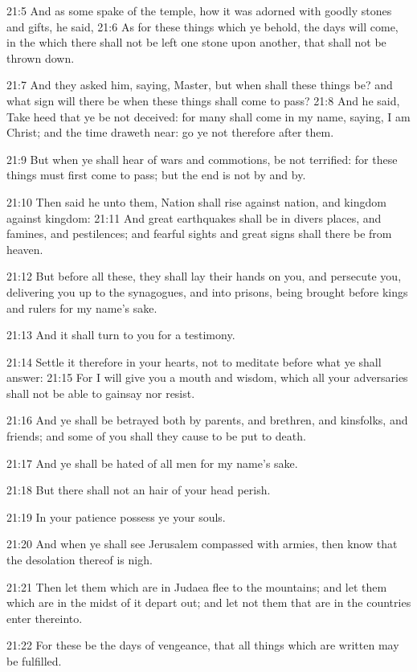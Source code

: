 21:5 And as some spake of the temple, how it was adorned with goodly stones and gifts, he said, 21:6 As for these things which ye behold, the days will come, in the which there shall not be left one stone upon another, that shall not be thrown down.

21:7 And they asked him, saying, Master, but when shall these things be?  and what sign will there be when these things shall come to pass?  21:8 And he said, Take heed that ye be not deceived: for many shall come in my name, saying, I am Christ; and the time draweth near: go ye not therefore after them.

21:9 But when ye shall hear of wars and commotions, be not terrified: for these things must first come to pass; but the end is not by and by.

21:10 Then said he unto them, Nation shall rise against nation, and kingdom against kingdom: 21:11 And great earthquakes shall be in divers places, and famines, and pestilences; and fearful sights and great signs shall there be from heaven.

21:12 But before all these, they shall lay their hands on you, and persecute you, delivering you up to the synagogues, and into prisons, being brought before kings and rulers for my name's sake.

21:13 And it shall turn to you for a testimony.

21:14 Settle it therefore in your hearts, not to meditate before what ye shall answer: 21:15 For I will give you a mouth and wisdom, which all your adversaries shall not be able to gainsay nor resist.

21:16 And ye shall be betrayed both by parents, and brethren, and kinsfolks, and friends; and some of you shall they cause to be put to death.

21:17 And ye shall be hated of all men for my name's sake.

21:18 But there shall not an hair of your head perish.

21:19 In your patience possess ye your souls.

21:20 And when ye shall see Jerusalem compassed with armies, then know that the desolation thereof is nigh.

21:21 Then let them which are in Judaea flee to the mountains; and let them which are in the midst of it depart out; and let not them that are in the countries enter thereinto.

21:22 For these be the days of vengeance, that all things which are written may be fulfilled.

